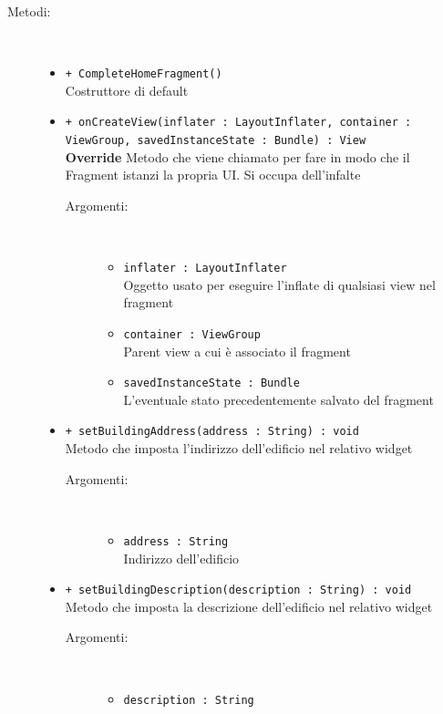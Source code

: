 \documentclass[../DefinizioneDiProdotto.tex]{subfiles}
\begin{document}
\begin{description}
\begin{itemize}
	\end{itemize}
	\item[Metodi:] \
	\begin{itemize}
		\item \texttt{+ CompleteHomeFragment()}\\
		Costruttore di default
		\item \texttt{+ onCreateView(inflater : LayoutInflater, container : ViewGroup, savedInstanceState : Bundle) : View}\\
		\textbf{Override} Metodo che viene chiamato per fare in modo che il Fragment istanzi la propria UI. Si occupa dell'infalte
		\begin{description}
			\item[Argomenti:] \
			\begin{itemize}
				\item \texttt{inflater : LayoutInflater}\\
				Oggetto usato per eseguire l'inflate di qualsiasi view nel fragment\item \texttt{container : ViewGroup}\\
				Parent view a cui è associato il fragment\item \texttt{savedInstanceState : Bundle}\\
				L'eventuale stato precedentemente salvato del fragment\end{itemize}
		\end{description}
		\item \texttt{+ setBuildingAddress(address : String) : void}\\
		Metodo che imposta l'indirizzo dell'edificio nel relativo widget
		\begin{description}
			\item[Argomenti:] \
			\begin{itemize}
				\item \texttt{address : String}\\
				Indirizzo dell'edificio\end{itemize}
		\end{description}
		\item \texttt{+ setBuildingDescription(description : String) : void}\\
		Metodo che imposta la descrizione dell'edificio nel relativo widget
		\begin{description}
			\item[Argomenti:] \
			\begin{itemize}
				\item \texttt{description : String}\\

\end{itemize}
\end{description}
\end{itemize}
\end{description}
\end{document}
